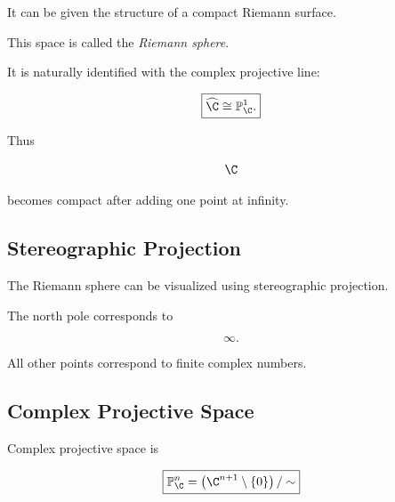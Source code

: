 It can be given the structure of a compact Riemann surface.

This space is called the \emph{Riemann sphere}.

It is naturally identified with the complex projective line:

\[
\boxed{
\widehat{\C}\cong\mathbb{P}^1_{\C}.
}
\]

Thus

\[
\C
\]

becomes compact after adding one point at infinity.

\subsection{Stereographic Projection}
\label{subsec:stereographic-projection-complex}

The Riemann sphere can be visualized using stereographic projection.

\begin{centereddiagram}
\end{centereddiagram}

The north pole corresponds to

\[
\infty.
\]

All other points correspond to finite complex numbers.

\subsection{Complex Projective Space}
\label{subsec:complex-projective-space}

Complex projective space is

\[
\boxed{
\mathbb{P}^n_{\C}
=
\left(
\C^{n+1}\setminus\{0\}
\right)/\sim
}
\]

